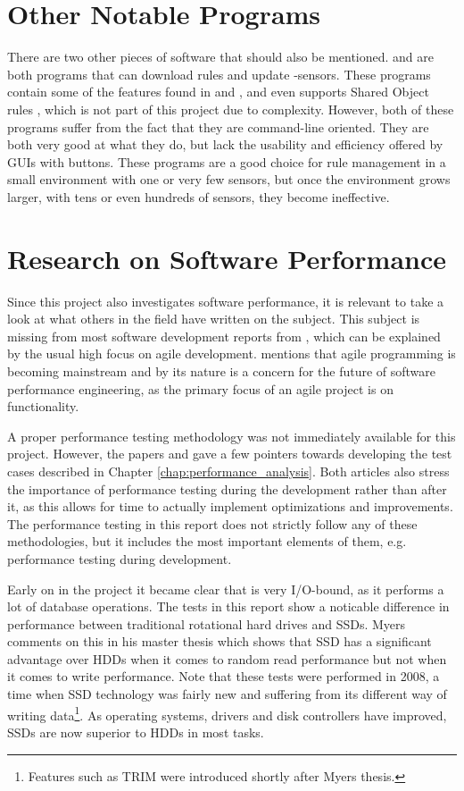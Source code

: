 \section{Other Notable Programs}
There are two other pieces of software that should also be mentioned.
\pulledpork{} and \oinkmaster{} are both programs that can download rules and
update \snort{}-sensors. These programs contain some of the features found
in \snowman{} and \bhtb{}, and \pulledpork{} even supports
Shared Object rules \cite{SnortManual}, which is not part of this project due to
complexity. However, both of these programs suffer from the fact that they are
command-line oriented. They are both very good at what they do, but lack the
usability and efficiency offered by GUIs with buttons. These programs are a
good choice for rule management in a small environment with one or very few
sensors, but once the environment grows larger, with tens or even hundreds of
sensors, they become ineffective.

\section{Research on Software Performance}
Since this project also investigates software performance, it is relevant to
take a look at what others in the field have written on the subject. This
subject is missing from most software development reports from \GUC{}, which can be
explained by the usual high focus on agile development. 
\cite{FutureEngineering} mentions that agile programming is becoming mainstream
and by its nature is a concern for the future of software performance
engineering, as the primary focus of an agile project is on functionality.

A proper performance testing methodology was not immediately available for
this project. However, the papers \cite{WOSP98} and \cite{WOSP04} gave a few
pointers towards developing the test cases described in Chapter
\ref{chap:performance_analysis}. Both articles also stress the importance of
performance testing during the development rather than after it, as this allows
for time to actually implement optimizations and improvements. The performance
testing in this report does not strictly follow any of these methodologies, but
it includes the most important elements of them, e.g. performance testing during
development.

Early on in the project it became clear that \snowman{} is very I/O-bound, as it
performs a lot of database operations. The tests in this report show a noticable
difference in performance between traditional rotational hard drives and SSDs.
Myers comments on this in his master thesis \cite{Myers} which shows that SSD
has a significant advantage over HDDs when it comes to random read performance
but not when it comes to write performance. Note that these tests were performed
in 2008, a time when SSD technology was fairly new and suffering
from its different way of writing data\footnote{Features such as TRIM were
introduced shortly after Myers thesis.}. As operating systems, drivers and disk
controllers have improved, SSDs are now superior to HDDs in most tasks.